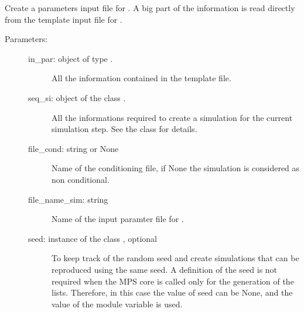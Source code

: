 \documentclass[letterpaper,10pt,english]{sphinxmanual}
\begin{document}

\begin{fulllineitems}
\label{\detokenize{appendices:s2Dcd.s2Dcd.create_in_file4Impala}}
Create a parameters input file for . A big part of the
information is read directly from the template input file for
.
\begin{description}
\item[{Parameters:}] \leavevmode\begin{description}
\item[{in\_par: object of type .}] \leavevmode
All the information contained in the template file.

\item[{seq\_si: object of the class {\hyperref[\detokenize{appendices:s2Dcd.s2Dcd.SeqStep}]{}}.}] \leavevmode
All the informations required to create a simulation for the
current simulation step. See the class {\hyperref[\detokenize{appendices:s2Dcd.s2Dcd.SeqStep}]{}}
for details.

\item[{file\_cond: string or None}] \leavevmode
Name of the conditioning file, if None the simulation is
considered as non conditional.

\item[{file\_name\_sim: string}] \leavevmode
Name of the input paramter file for .

\item[{seed: instance of the class , optional}] \leavevmode
To keep track of the random seed and create simulations
that can be reproduced using the same seed.  A definition
of the seed is not required when the MPS core is called
only for the generation of the lists. Therefore, in this
case the value of seed can be None, and the value of the
module variable  is used.

\end{description}


\end{description}
\end{fulllineitems}
\end{document}
